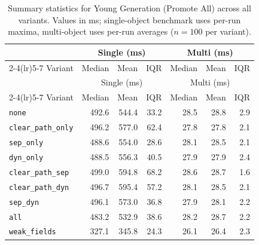 \begin{longtable}[c]{l rrr rrr}
\caption[Young Generation (Promote All) summary statistics]{Summary statistics for Young Generation (Promote All) across all variants. Values in ms; single-object benchmark uses per-run maxima, multi-object uses per-run averages ($n=100$ per variant).}\label{tab:stats-young-gen} \\
\toprule
 & \multicolumn{3}{c}{Single (ms)} & \multicolumn{3}{c}{Multi (ms)} \\
\cmidrule(lr){2-4}\cmidrule(lr){5-7}
Variant & Median & Mean & IQR & Median & Mean & IQR \\
\midrule
\endfirsthead
\toprule
 & \multicolumn{3}{c}{Single (ms)} & \multicolumn{3}{c}{Multi (ms)} \\
\cmidrule(lr){2-4}\cmidrule(lr){5-7}
Variant & Median & Mean & IQR & Median & Mean & IQR \\
\midrule
\endhead
\bottomrule
\endfoot
\texttt{none} & 492.6 & 544.4 & 33.2 & 28.5 & 28.8 & 2.9 \\
\texttt{clear\_path\_only} & 496.2 & 577.0 & 62.4 & 27.8 & 27.8 & 2.1 \\
\texttt{sep\_only} & 488.6 & 554.0 & 28.6 & 28.1 & 28.5 & 2.1 \\
\texttt{dyn\_only} & 488.5 & 556.3 & 40.5 & 27.9 & 27.9 & 2.4 \\
\texttt{clear\_path\_sep} & 499.0 & 594.8 & 68.2 & 28.6 & 28.7 & 1.6 \\
\texttt{clear\_path\_dyn} & 496.7 & 595.4 & 57.2 & 28.1 & 28.5 & 2.1 \\
\texttt{sep\_dyn} & 496.1 & 573.0 & 36.8 & 27.9 & 28.1 & 2.2 \\
\texttt{all} & 483.2 & 532.9 & 38.6 & 28.2 & 28.7 & 2.2 \\
\texttt{weak\_fields} & 327.1 & 345.8 & 24.3 & 26.1 & 26.4 & 2.3 \\
\end{longtable}

